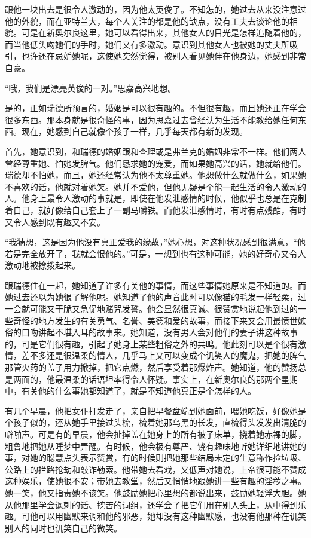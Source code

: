\par 跟他一块出去是很令人激动的，因为他太英俊了。不知怎的，她过去从来没注意过他的外貌，而在亚特兰大，每个人关注的都是他的缺点，没有工夫去谈论他的相貌。可是在新奥尔良这里，她可以看得出来，其他女人的目光是怎样追随着他的，而当他低头吻她们的手时，她们又有多激动。意识到其他女人也被她的丈夫所吸引，也许还在忌妒她呢，这使她突然觉得，被别人看见她伴在他身边，她感到非常自豪。
\par “哦，我们是漂亮英俊的一对。”思嘉高兴地想。
\par 是的，正如瑞德所预言的，婚姻是可以很有趣的。不但很有趣，而且她还正在学会很多东西。那本身就是很奇怪的事，因为思嘉过去曾经认为生活不能教给她任何东西。现在，她感到自己就像个孩子一样，几乎每天都有新的发现。
\par 首先，她意识到，和瑞德的婚姻跟和查理或是弗兰克的婚姻非常不一样。他们两人曾经尊重她、怕她发脾气。他们恳求她的宠爱，而如果她高兴的话，她就给他们。瑞德却不怕她，而且，她还经常认为他不太尊重她。他想做什么就做什么，如果她不喜欢的话，他就对着她笑。她并不爱他，但他无疑是个能一起生活的令人激动的人。他身上最令人激动的事就是，即使在他发泄感情的时候，他似乎也总是在克制着自己，就好像给自己套上了一副马嚼铁。而他发泄感情时，有时有点残酷，有时又令人感到既有趣又不安。
\par “我猜想，这是因为他没有真正爱我的缘故，”她心想，对这种状况感到很满意，“他若是完全放开了，我就会恨他的。”可是，一想到也有这种可能，她的好奇心又令人激动地被撩拨起来。
\par 跟瑞德住在一起，她知道了许多有关他的事情，而这些事情她原来是不知道的。而她过去还以为她很了解他呢。她知道了他的声音此时可以像猫的毛发一样轻柔，过一会就可能又干脆又急促地赌咒发誓。他会显然很真诚、很赞赏地说起他到过的一些奇怪的地方发生的有关勇气、名誉、美德和爱的故事，而接下来又会用最愤世嫉俗的口吻讲起不堪入耳的故事来。她知道，没有男人会对他们的妻子讲这种故事的，可是它们很有趣，引起了她身上某些粗俗之外的共鸣。他此刻可以是个很有激情，差不多还是很温柔的情人，几乎马上又可以变成个讥笑人的魔鬼，把她的脾气那管火药的盖子用力掀掉，把它点燃，然后享受着那爆炸声。她知道，他的赞扬总是两面的，他最温柔的话语坦率得令人怀疑。事实上，在新奥尔良的那两个星期中，有关他的什么事她都知道了，就是不知道他真正是个怎样的人。
\par 有几个早晨，他把女仆打发走了，亲自把早餐盘端到她面前，喂她吃饭，好像她是个孩子似的，还从她手里接过头梳，梳着她那乌黑的长发，直梳得头发发出清脆的噼啪声。可是有的早晨，他会扯掉盖在她身上的所有被子床单，挠着她赤裸的脚，粗鲁地把她从睡梦中弄醒。有时候，他会极有尊严、饶有趣味地听她详细地讲她的事，对她的聪慧点头表示赞赏，有的时候则把她那些结局未定的生意称作捡垃圾、公路上的拦路抢劫和敲诈勒索。他带她去看戏，又低声对她说，上帝很可能不赞成这种娱乐，使她很不安；带她去教堂，然后又悄悄地跟她讲一些有趣的淫秽之事。她一笑，他又指责她不该笑。他鼓励她把心里想的都说出来，鼓励她轻浮大胆。她从他那里学会讽刺的话、挖苦的词组，还学会了把它们用在别人头上，从中得到乐趣。可他可以用幽默来调和他的邪恶，她却没有这种幽默感，也没有他那种在讥笑别人的同时也讥笑自己的微笑。
